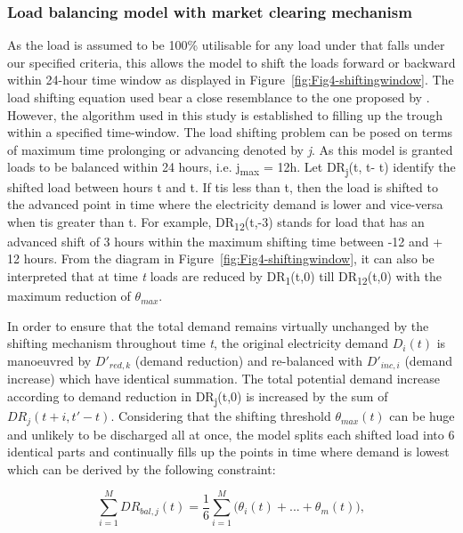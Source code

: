 \documentclass{pasa}%
\begin{document}
\subsubsection{Load balancing model with market clearing mechanism}\label{loadbalancing}

As the load is assumed to be 100\% utilisable for any load under that falls under our specified criteria, this allows the model to shift the loads forward or backward within 24-hour time window as displayed in Figure~\ref{fig:Fig4-shiftingwindow}. The load shifting equation used bear a close resemblance to the one proposed by \cite{feuerriegel2014}. However, the algorithm used in this study is established to filling up the trough within a specified time-window. The load shifting problem can be posed on terms of maximum time prolonging or advancing denoted by \textit{j}. As this model is granted loads to be balanced within 24 hours, i.e. j\textsubscript{max} = 12h. Let DR\textsubscript{j}(t, t\textquotesingle - t) identify the shifted load between hours t and t\textquotesingle. If t\textquotesingle is less than t, then the load is shifted to the advanced point in time where the electricity demand is lower and vice-versa when t\textquotesingle is greater than t. For example, DR\textsubscript{12}(t,-3) stands for load that has an advanced shift of 3 hours within the maximum shifting time between -12 and + 12 hours. From the diagram in Figure~\ref{fig:Fig4-shiftingwindow}, it can also be interpreted that at time \textit{t} loads are reduced by DR\textsubscript{1}(t,0) till DR\textsubscript{12}(t,0) with the maximum reduction of $\theta_{max}$.


In order to ensure that the total demand remains virtually unchanged by the shifting mechanism throughout time \textit{t}, the original electricity demand $D_i (t)$ is manoeuvred by $D'_{red,k}$ (demand reduction) and re-balanced with $D'_{inc,i}$ (demand increase) which have identical summation. The total potential demand increase according to demand reduction in DR\textsubscript{j}(t,0) is increased by the sum of $DR_j (t+i, t'-t)$. Considering that the shifting threshold $\theta_{max} (t)$ can be huge and unlikely to be discharged all at once, the model splits each shifted load into 6 identical parts and continually fills up the points in time where demand is lowest which can be derived by the following constraint:

\begin{equation}\label{eq_loadbalancing1}
\sum_{i=1}^{M} DR_{bal,j} (t) = \frac{1}{6} \sum_{i=1}^{M} \big( \theta_i (t) + ... + \theta_m (t) \big),
\end{equation}
\end{document}
